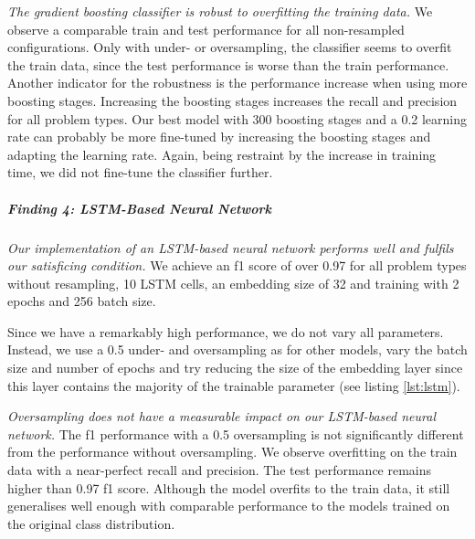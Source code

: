 \textit{The gradient boosting classifier is robust to overfitting the training data.} We observe a comparable train and test performance for all non-resampled configurations. Only with under- or oversampling, the classifier seems to overfit the train data, since the test performance is worse than the train performance. 
Another indicator for the robustness is the performance increase when using more boosting stages. Increasing the boosting stages increases the recall and precision for all problem types. Our best model with 300 boosting stages and a 0.2 learning rate can probably be more fine-tuned by increasing the boosting stages and adapting the learning rate. Again, being restraint by the increase in training time, we did not fine-tune the classifier further.

\begin{center}
\end{center}


\subparagraph{Finding 4: LSTM-Based Neural Network}
\textit{Our implementation of an LSTM-based neural network performs well and fulfils our satisficing condition.} We achieve an f1 score of over 0.97 for all problem types without resampling, 10 LSTM cells, an embedding size of 32 and training with 2 epochs and 256 batch size. 


Since we have a remarkably high performance, we do not vary all parameters. Instead, we use a 0.5 under- and oversampling as for other models, vary the batch size and number of epochs and try reducing the size of the embedding layer since this layer contains the majority of the trainable parameter (see listing \ref{lst:lstm}).


\textit{Oversampling does not have a measurable impact on our LSTM-based neural network.} The f1 performance with a 0.5 oversampling is not significantly different from the performance without oversampling. We observe overfitting on the train data with a near-perfect recall and precision. The test performance remains higher than 0.97 f1 score. Although the model overfits to the train data, it still generalises well enough with comparable performance to the models trained on the original class distribution.


